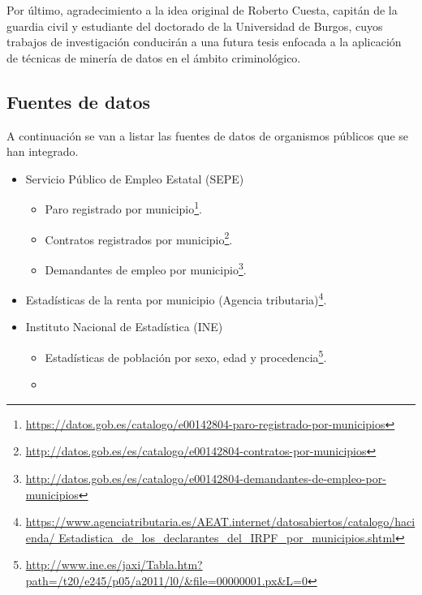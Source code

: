 Por último, agradecimiento a la idea original de Roberto Cuesta, capitán de la guardia civil y estudiante del doctorado de la Universidad de Burgos, cuyos trabajos de investigación conducirán a una futura tesis enfocada a la aplicación de técnicas de minería de datos en el ámbito criminológico.

\subsection{Fuentes de datos}

A continuación se van a listar las fuentes de datos de organismos públicos que se han integrado.

\begin{itemize}
	\tightlist
	\item
	Servicio Público de Empleo Estatal (SEPE)
	\begin{itemize}
		\tightlist
		\item
		Paro registrado por municipio\footnote{\href{https://datos.gob.es/catalogo/e00142804-paro-registrado-por-municipios}{https://datos.gob.es/catalogo/e00142804-paro-registrado-por-municipios}}.
		\item
		Contratos registrados por municipio\footnote{\href{http://datos.gob.es/es/catalogo/e00142804-contratos-por-municipios}{http://datos.gob.es/es/catalogo/e00142804-contratos-por-municipios}}.
		\item
		Demandantes de empleo por municipio\footnote{\href{http://datos.gob.es/es/catalogo/e00142804-demandantes-de-empleo-por-municipios}{http://datos.gob.es/es/catalogo/e00142804-demandantes-de-empleo-por-municipios}}.
	\end{itemize}
	\item 
	Estadísticas de la renta por municipio (Agencia tributaria)\footnote{\href{https://www.agenciatributaria.es/AEAT.internet/datosabiertos/catalogo/hacienda/Estadistica\_de\_los\_declarantes\_del\_IRPF\_por\_municipios.shtml}{https://www.agenciatributaria.es/AEAT.internet/datosabiertos/catalogo/hacienda/ Estadistica\_de\_los\_declarantes\_del\_IRPF\_por\_municipios.shtml}}.
	\item
	Instituto Nacional de Estadística (INE)
	\begin{itemize}
		\item
		Estadísticas de población por sexo, edad y procedencia\footnote{\href{http://www.ine.es/jaxi/Tabla.htm?path=/t20/e245/p05/a2011/l0/\&file=00000001.px\&L=0}{http://www.ine.es/jaxi/Tabla.htm?path=/t20/e245/p05/a2011/l0/\&file=00000001.px\&L=0}}.
		\item

\end{itemize}
\end{itemize}
